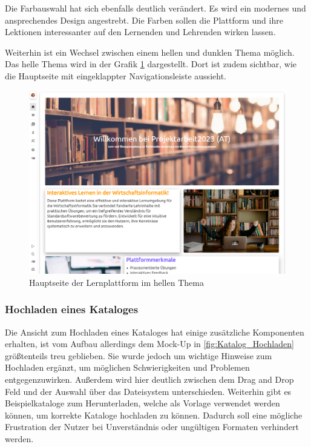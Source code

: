 Die Farbauswahl hat sich ebenfalls deutlich verändert. Es wird ein modernes und ansprechendes Design angestrebt. Die Farben sollen die Plattform und ihre Lektionen interessanter auf den Lernenden und Lehrenden wirken lassen.

Weiterhin ist ein Wechsel zwischen einem hellen und dunklen Thema möglich. 
Das helle Thema wird in der Grafik \ref{fig:light_theme_gui} dargestellt. Dort ist zudem sichtbar, wie die Hauptseite mit eingeklappter Navigationsleiste aussieht.

\begin{figure}[H]
    \centering
    \includegraphics[width=1.0\textwidth]{assets/screenshots/finale_gui/Light_Theme.png}
    \caption{Hauptseite der Lernplattform im hellen Thema}
    \label{fig:light_theme_gui}
\end{figure}

\subsubsection{Hochladen eines Kataloges}

Die Ansicht zum Hochladen eines Kataloges hat einige zusätzliche Komponenten erhalten, ist vom Aufbau allerdings dem Mock-Up in \ref{fig:Katalog_Hochladen} größtenteils treu geblieben. Sie wurde jedoch um wichtige Hinweise zum Hochladen ergänzt, um möglichen Schwierigkeiten und Problemen entgegenzuwirken. Außerdem wird hier deutlich zwischen dem Drag and Drop Feld und der Auswahl über das Dateisystem unterschieden. 
Weiterhin gibt es Beispielkataloge zum Herunterladen, welche als Vorlage verwendet werden können, um korrekte Kataloge hochladen zu können. Dadurch soll eine mögliche Frustration der Nutzer bei Unverständnis oder ungültigen Formaten verhindert werden.

